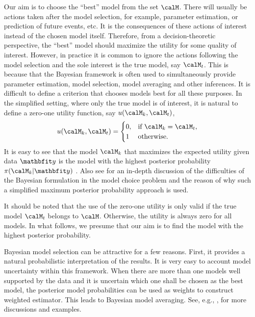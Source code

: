 Our aim is to choose the ``best'' model from the set $\calM$. There will
usually be actions taken after the model selection, for example, parameter
estimation, or prediction of future events, etc. It is the consequences of
these actions of interest instead of the chosen model itself. Therefore, from
a decision-theoretic perspective, the ``best'' model should maximize the
utility for some quality of interest. However, in practice it is common to
ignore the actions following the model selection and the sole interest is the
true model, say $\calM_t$. This is because that the Bayesian framework is
often used to simultaneously provide parameter estimation, model selection,
model averaging and other inferences. It is difficult to define a criterion
that chooses models best for all these purposes. In the simplified setting,
where only the true model is of interest, it is natural to define a zero-one
utility function, say $u(\calM_k,\calM_t)$,
\begin{equation}
  u(\calM_k,\calM_t) =
  \begin{cases}
    0, &\text{if } \calM_k = \calM_t,\\
    1  &\text{otherwise.}
  \end{cases}
\end{equation}
It is easy to see that the model $\calM_k$ that maximizes the expected
utility given data $\data$ is the model with the highest posterior
probability $\pi(\calM_k|\data)$ \cite[][chap.~6]{Bernardo:1994vd}. Also see
\cite[][sec.~7.2.1]{Robert:2007tc} for an in-depth discussion of the
difficulties of the Bayesian formulation in the model choice problem and the
reason of why such a simplified maximum posterior probability approach is
used.

It should be noted that the use of the zero-one utility is only valid if the
true model $\calM_t$ belongs to $\calM$. Otherwise, the utility is always zero
for all models. In what follows, we presume that our aim is to find the model
with the highest posterior probability.

Bayesian model selection can be attractive for a few reasons. First, it
provides a natural probabilistic interpretation of the results. It is very
easy to account model uncertainty within this framework. When there are more
than one models well supported by the data and it is uncertain which one shall
be chosen as the best model, the posterior model probabilities can be used as
weights to construct weighted estimator. This leads to Bayesian model
averaging. See, e.g., \cite{Raftery:1997vx,Clyde:1999vx,Draper:1995vx}, for
more discussions and examples.

